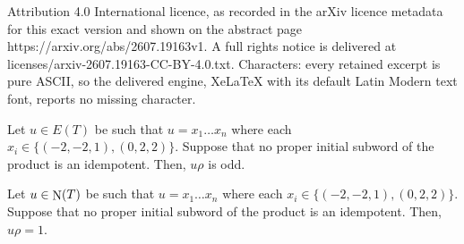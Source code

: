 \documentclass[10pt,a4paper]{amsart}
\DeclareMathOperator{\N}{\textup{\textsf{N}}}
\begin{document}
Attribution 4.0 International licence, as recorded in the arXiv licence metadata for this exact version and shown on the abstract page https://arxiv.org/abs/2607.19163v1. A full rights notice is delivered at licenses/arxiv-2607.19163-CC-BY-4.0.txt. Characters: every retained excerpt is pure ASCII, so the delivered engine, XeLaTeX with its default Latin Modern text font, reports no missing character.
\begin{claim}
\label{cl:HowsonCounter2}
Let $u\in E(T)$ be such that $u = x_1\dots x_n$ where each $x_i\in\{(-2, -2, 1), (0, 2, 2)\}$. Suppose that no proper initial subword of the product is an idempotent. Then, $u\rho$ is odd.
\end{claim}

\begin{claim}
\label{cl:HowsonCounter1}
Let $u\in \N(T)$ be such that $u = x_1\dots x_n$ where each $x_i\in\{(-2, -2, 1), (0, 2, 2)\}$. Suppose that no proper initial subword of the product is an idempotent. Then, $u\rho = 1$.
\end{claim}
\end{document}
